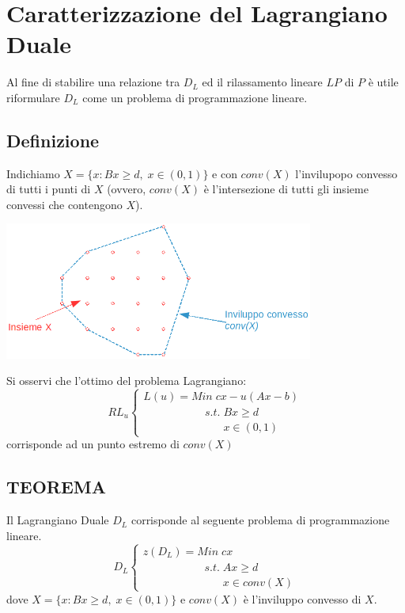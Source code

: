 \section{Caratterizzazione del Lagrangiano Duale}
Al fine di stabilire una relazione tra $D_{L}$ ed il rilassamento lineare $LP$ di $P$ è utile riformulare $D_{L}$ come un problema di programmazione lineare.
\subsection{Definizione}
Indichiamo $X=\{x: Bx\ge d,\;x\in(0,1) \}$ e con $conv(X)$ l'invilupopo convesso di tutti i punti di $X$ (ovvero, $conv(X)$ è l'intersezione di tutti gli insieme convessi che contengono $X$).
\centerline{\includegraphics[height=4.5cm]{images/graph27.png}}
Si osservi che l'ottimo del problema Lagrangiano:
\begin{displaymath}
	RL_{u}
	\begin{cases}
		L(u)=Min\;cx-u(Ax-b) \\
		\;\;\;\;\;\;\;\;\;\;\;\;\;\;\;\;\;\;\;\;s.t.\;Bx\ge d \\
		\;\;\;\;\;\;\;\;\;\;\;\;\;\;\;\;\;\;\;\;\;\;\;\;\;\;x\in (0,1)
	\end{cases}
\end{displaymath}
corrisponde ad un punto estremo di $conv(X)$
\subsection{TEOREMA}
Il Lagrangiano Duale $D_{L}$ corrisponde al seguente problema di programmazione lineare.
\begin{displaymath}
D_{L}
\begin{cases}
z(D_{L})=Min\;cx \\
\;\;\;\;\;\;\;\;\;\;\;\;\;\;\;\;\;\;\;\;s.t.\;Ax\ge d \\
\;\;\;\;\;\;\;\;\;\;\;\;\;\;\;\;\;\;\;\;\;\;\;\;\;\;x\in conv(X)
\end{cases}
\end{displaymath}
dove $X=\{x:Bx\ge d,\;x\in(0,1)\}$ e $conv(X)$ è l'inviluppo convesso di $X$.
